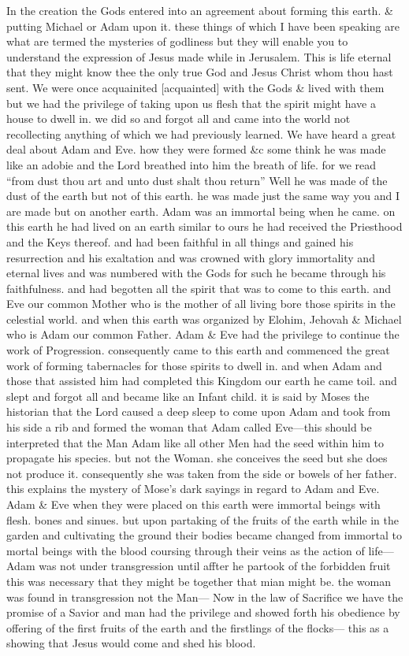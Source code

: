 					In the creation the Gods entered into an agreement about forming this earth. \& putting Michael or Adam upon it. these things of which I have been speaking are what are termed the mysteries of godliness but they will enable you to understand the expression of Jesus made while in Jerusalem. This is life eternal that they might know thee the only true God and Jesus Christ whom thou hast sent. We were once acquainited [acquainted] with the Gods \& lived with them but we had the privilege of taking upon us flesh that the spirit might have a house to dwell in. we did so and forgot all and came into the world not recollecting anything of which we had previously learned. We have heard a great deal about Adam and Eve. how they were formed \&c some think he was made like an adobie and the Lord breathed into him the breath of life. for we read ``from dust thou art and unto dust shalt thou return'' Well he was made of the dust of the earth but not of this earth. he was made just the same way you and I are made but on another earth. Adam was an immortal being when he came. on this earth he had lived on an earth similar to ours he had received the Priesthood and the Keys thereof. and had been faithful in all things and gained his resurrection and his exaltation and was crowned with glory immortality and eternal lives and was numbered with the Gods for such he became through his faithfulness. and had begotten all the spirit that was to come to this earth. and Eve our common Mother who is the mother of all living bore those spirits in the celestial world. and when this earth was organized by Elohim, Jehovah \& Michael who is Adam our common Father. Adam \& Eve had the privilege to continue the work of Progression. consequently came to this earth and commenced the great work of forming tabernacles for those spirits to dwell in. and when Adam and those that assisted him had completed this Kingdom our earth he came toil. and slept and forgot all and became like an Infant child. it is said by Moses the historian that the Lord caused a deep sleep to come upon Adam and took from his side a rib and formed the woman that Adam called Eve---this should be interpreted that the Man Adam like all other Men had the seed within him to propagate his species. but not the Woman. she conceives the seed but she does not produce it. consequently she was taken from the side or bowels of her father. this explains the mystery of Mose's dark sayings in regard to Adam and Eve. Adam \& Eve when they were placed on this earth were immortal beings with flesh. bones and sinues. but upon partaking of the fruits of the earth while in the garden and cultivating the ground their bodies became changed from immortal to mortal beings with the blood coursing through their veins as the action of life---Adam was not under transgression until affter he partook of the forbidden fruit this was necessary that they might be together that mian might be. the woman was found in transgression not the Man--- Now in the law of Sacrifice we have the promise of a Savior and man had the privilege and showed forth his obedience by offering of the first fruits of the earth and the firstlings of the flocks--- this as a showing that Jesus would come and shed his blood.
					
